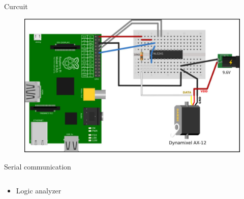 \documentclass{beamer}
\begin{document}

\begin{frame}{Curcuit}

    \begin{figure}
        \centering
        \includegraphics[width = \textwidth]{img/curcuit.jpg}
        
    \end{figure}
    
\end{frame}



\begin{frame}{Serial communication}

    \begin{columns}
        \begin{column}[]{0.5\textwidth}
            \begin{itemize}
                \item Logic analyzer
            \end{itemize}
        \end{column}
        
        
        \begin{column}[]{0.5\textwidth}
        \end{column}
    \end{columns}
    
\end{frame}

\end{document}

